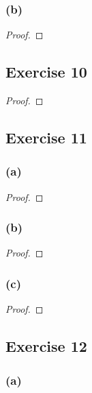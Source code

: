 \documentclass[14pt]{extarticle}
\begin{document}
\subsubsection{(b)}

\begin{proof}

\end{proof}

\subsection{Exercise 10}

\begin{proof}

\end{proof}

\subsection{Exercise 11}
\subsubsection{(a)}

\begin{proof}

\end{proof}

\subsubsection{(b)}

\begin{proof}

\end{proof}

\subsubsection{(c)}

\begin{proof}

\end{proof}

\subsection{Exercise 12}

\subsubsection{(a)}
\end{document}
